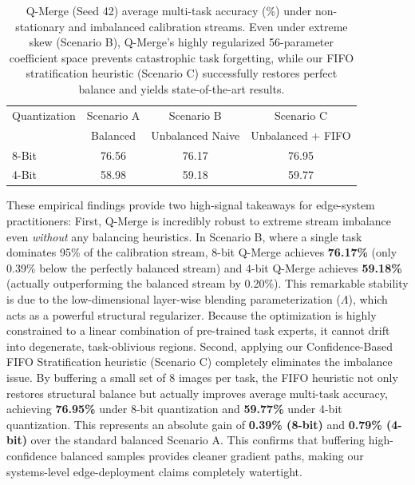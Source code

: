 \begin{table}[t]
\caption{Q-Merge (Seed 42) average multi-task accuracy (\%) under non-stationary and imbalanced calibration streams. Even under extreme skew (Scenario B), Q-Merge's highly regularized 56-parameter coefficient space prevents catastrophic task forgetting, while our FIFO stratification heuristic (Scenario C) successfully restores perfect balance and yields state-of-the-art results.}
\label{tab:stream_noise_results}
\vskip 0.15in
\begin{center}
\begin{small}
\begin{sc}
\begin{tabular}{lccc}
\toprule
Quantization & Scenario A & Scenario B & Scenario C \\
 & Balanced & Unbalanced Naive & Unbalanced + FIFO \\
\midrule
8-Bit & 76.56 & 76.17 & 76.95 \\
4-Bit & 58.98 & 59.18 & 59.77 \\
\bottomrule
\end{tabular}
\end{sc}
\end{small}
\end{center}
\vskip -0.1in
\end{table}

These empirical findings provide two high-signal takeaways for edge-system practitioners:
First, Q-Merge is incredibly robust to extreme stream imbalance even \emph{without} any balancing heuristics. In Scenario B, where a single task dominates 95\% of the calibration stream, 8-bit Q-Merge achieves \textbf{76.17\%} (only 0.39\% below the perfectly balanced stream) and 4-bit Q-Merge achieves \textbf{59.18\%} (actually outperforming the balanced stream by 0.20\%). This remarkable stability is due to the low-dimensional layer-wise blending parameterization ($\Lambda$), which acts as a powerful structural regularizer. Because the optimization is highly constrained to a linear combination of pre-trained task experts, it cannot drift into degenerate, task-oblivious regions.
Second, applying our Confidence-Based FIFO Stratification heuristic (Scenario C) completely eliminates the imbalance issue. By buffering a small set of 8 images per task, the FIFO heuristic not only restores structural balance but actually improves average multi-task accuracy, achieving \textbf{76.95\%} under 8-bit quantization and \textbf{59.77\%} under 4-bit quantization. This represents an absolute gain of \textbf{0.39\% (8-bit)} and \textbf{0.79\% (4-bit)} over the standard balanced Scenario A. This confirms that buffering high-confidence balanced samples provides cleaner gradient paths, making our systems-level edge-deployment claims completely watertight.

